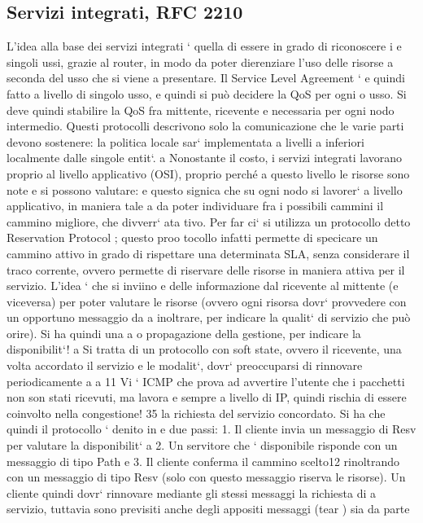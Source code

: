 \documentclass[a4paper,12pt]{article}
\begin{document}
\subsection{Servizi integrati, RFC 2210}
L'idea alla base dei servizi integrati ` quella di essere in grado di riconoscere i
e
singoli ussi, grazie al router, in modo da poter dierenziare l'uso delle risorse
a seconda del usso che si viene a presentare. Il Service Level Agreement `
e
quindi fatto a livello di singolo usso, e quindi si può decidere la QoS per ogni
o
usso. Si deve quindi stabilire la QoS fra mittente, ricevente e necessaria per
ogni nodo intermedio. Questi protocolli descrivono solo la comunicazione che
le varie parti devono sostenere: la politica locale sar` implementata a livelli
a
inferiori localmente dalle singole entit`.
a
Nonostante il costo, i servizi integrati lavorano proprio al livello applicativo
(OSI), proprio perché a questo livello le risorse sono note e si possono valutare:
e
questo signica che su ogni nodo si lavorer` a livello applicativo, in maniera tale
a
da poter individuare fra i possibili cammini il cammino migliore, che divverr` ata
tivo. Per far ci` si utilizza un protocollo detto Reservation Protocol ; questo proo
tocollo infatti permette di specicare un cammino attivo in grado di rispettare
una determinata SLA, senza considerare il traco corrente, ovvero permette di
riservare delle risorse in maniera attiva per il servizio. L'idea ` che si inviino
e
delle informazione dal ricevente al mittente (e viceversa) per poter valutare le
risorse (ovvero ogni risorsa dovr` provvedere con un opportuno messaggio da
a
inoltrare, per indicare la qualit` di servizio che può orire). Si ha quindi una
a
o
propagazione della gestione, per indicare la disponibilit`!
a
Si tratta di un protocollo con soft state, ovvero il ricevente, una volta accordato il servizio e le modalit`, dovr`
preoccuparsi di rinnovare periodicamente
a
a
11 Vi ` ICMP che prova ad avvertire l'utente che i pacchetti non son stati ricevuti, ma lavora
e
sempre a livello di IP, quindi rischia di essere coinvolto nella congestione!
35
la richiesta del servizio concordato. Si ha che quindi il protocollo ` denito in
e
due passi:
1. Il cliente invia un messaggio di Resv per valutare la disponibilit`
a
2. Un servitore che ` disponibile risponde con un messaggio di tipo Path
e
3. Il cliente conferma il cammino scelto12 rinoltrando con un messaggio di
tipo Resv (solo con questo messaggio riserva le risorse).
Un cliente quindi dovr` rinnovare mediante gli stessi messaggi la richiesta di
a
servizio, tuttavia sono previsiti anche degli appositi messaggi (tear ) sia da parte
\end{document}
